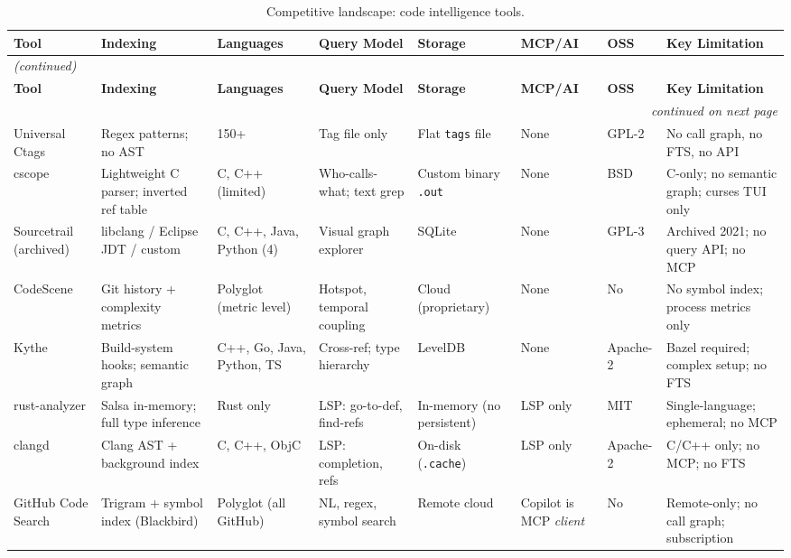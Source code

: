 \begin{longtable}{p{2.0cm}p{2.6cm}p{1.7cm}p{1.8cm}p{1.6cm}p{1.4cm}p{0.7cm}p{3.2cm}}
\caption{Competitive landscape: code intelligence tools.}
\label{tab:competitive} \\
\toprule
\textbf{Tool} & \textbf{Indexing} & \textbf{Languages} & \textbf{Query Model} & \textbf{Storage} & \textbf{MCP/AI} & \textbf{OSS} & \textbf{Key Limitation} \\
\midrule
\endfirsthead
\multicolumn{8}{l}{\small\itshape (continued)} \\
\toprule
\textbf{Tool} & \textbf{Indexing} & \textbf{Languages} & \textbf{Query Model} & \textbf{Storage} & \textbf{MCP/AI} & \textbf{OSS} & \textbf{Key Limitation} \\
\midrule
\endhead
\midrule
\multicolumn{8}{r}{\small\itshape continued on next page} \\
\endfoot
\bottomrule
\endlastfoot
Universal Ctags & Regex patterns; no AST & 150+ & Tag file only & Flat \texttt{tags} file & None & GPL-2 & No call graph, no FTS, no API \\
cscope & Lightweight C parser; inverted ref table & C, C++ (limited) & Who-calls-what; text grep & Custom binary \texttt{.out} & None & BSD & C-only; no semantic graph; curses TUI only \\
Sourcetrail \mbox{(archived)} & libclang / Eclipse JDT / custom & C, C++, Java, Python (4) & Visual graph explorer & SQLite & None & GPL-3 & Archived 2021; no query API; no MCP \\
CodeScene & Git history + complexity metrics & Polyglot (metric level) & Hotspot, temporal coupling & Cloud (proprietary) & None & No & No symbol index; process metrics only \\
Kythe & Build-system hooks; semantic graph & C++, Go, Java, Python, TS & Cross-ref; type hierarchy & LevelDB & None & Apache-2 & Bazel required; complex setup; no FTS \\
rust-analyzer & Salsa in-memory; full type inference & Rust only & LSP: go-to-def, find-refs & In-memory (no persistent) & LSP only & MIT & Single-language; ephemeral; no MCP \\
clangd & Clang AST + background index & C, C++, ObjC & LSP: completion, refs & On-disk (\texttt{.cache}) & LSP only & Apache-2 & C/C++ only; no MCP; no FTS \\
GitHub Code Search & Trigram + symbol index (Blackbird) & Polyglot (all GitHub) & NL, regex, symbol search & Remote cloud & Copilot is MCP \emph{client} & No & Remote-only; no call graph; subscription \\

\end{longtable}
